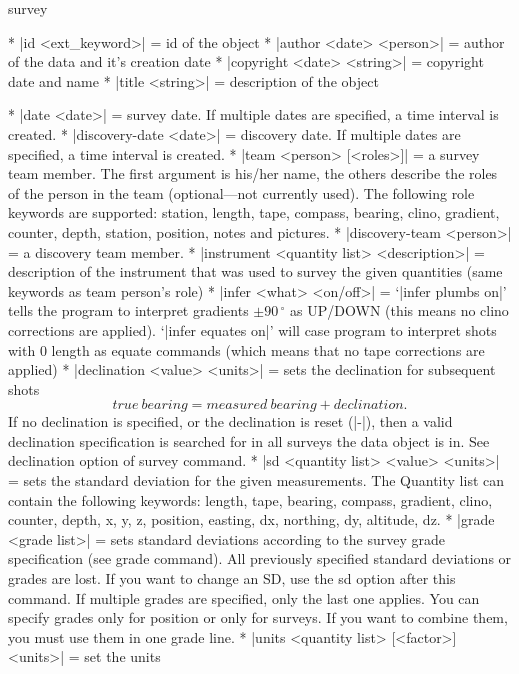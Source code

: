 \context
  survey
\endcontext

\options
  * |id <ext_keyword>| = id of the object
  * |author <date> <person>| = author of the data and it's creation date
  * |copyright <date> <string>| = copyright date and name
  * |title <string>| = description of the object
\endoptions


\comopt
  * |date <date>| = survey date. If multiple dates are specified,
    a time interval is created.
  * |discovery-date <date>| = discovery date. If multiple dates are specified,
    a time interval is created.
  * |team <person> [<roles>]| = a survey team member. The first argument
    is his/her name, the others describe the roles of the person in
    the team (optional---not currently used). The following role keywords are
    supported: station, length, tape, compass, bearing, clino,
    gradient, counter, depth, station, position, notes and pictures.
  * |discovery-team <person>| = a discovery team member. 
  * |instrument <quantity list> <description>| = description
    of the instrument that was used to survey the given quantities (same
    keywords as team person's role)
  * |infer <what> <on/off>| = `|infer plumbs on|' tells the
    program to interpret gradients $\pm90\,^\circ$ 
    as UP/DOWN (this means
    no clino corrections are applied). `|infer equates on|' will case program to
    interpret shots with 0 length as equate commands (which means that no
    tape corrections are applied)
  * |declination <value> <units>| = sets the declination for subsequent
    shots $$true\ bearing = measured\ bearing + declination.$$
    If no declination is specified, or the declination is reset (|-|),
    then a valid declination specification is searched for in all surveys
    the data object is in. See declination option of survey command.
  * |sd <quantity list> <value> <units>| = sets the 
    standard deviation for the given measurements. The Quantity list can 
    contain the following keywords: length, tape, bearing, compass, 
    gradient, clino, counter, depth, x, y, z, position, easting, dx,
    northing, dy, altitude, dz.
  * |grade <grade list>| = sets standard deviations according to the
    survey grade specification (see grade command). All previously
    specified standard deviations or grades are lost. If you want 
    to change an SD, use the sd option after this command. If multiple
    grades are specified, only the last one applies. You can specify
    grades only for position or only for surveys. If you want to
    combine them, you must use them in one grade line.
  * |units <quantity list> [<factor>] <units>| = set the units
